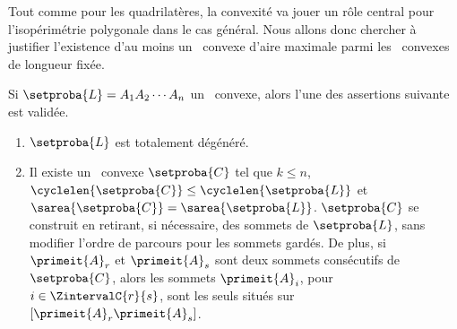 Tout comme pour les quadrilatères, la convexité va jouer un rôle central pour l’isopérimétrie polygonale dans le cas général.
Nous allons donc chercher à justifier l'existence d'au moins un \ngone\ convexe d'aire maximale parmi les \ngones\ convexes de longueur fixée.




\begin{fact} \label{conv-from-non-neg-det}
    Si $\setproba{L} = A_1 A_2 \cdots A_n$ un \ncycle\ convexe, alors l'une des assertions suivante est validée.
	\begin{enumerate}
		\item $\setproba{L}$ est totalement dégénéré.

		\item Il existe un \kgone\ convexe $\setproba{C}$ tel que
		$k \leq n$, 
		$\cyclelen{\setproba{C}} \leq \cyclelen{\setproba{L}}$
		et
		$\sarea{\setproba{C}} = \sarea{\setproba{L}}$.
		$\setproba{C}$ se construit en retirant, si nécessaire, des sommets de $\setproba{L}$, sans modifier l'ordre de parcours pour les sommets gardés.
		De plus,
		si $\primeit{A}_r$ et $\primeit{A}_s$ sont deux sommets consécutifs de $\setproba{C}$,
		alors les sommets $\primeit{A}_i$, pour $i \in \ZintervalC{r}{s}$, sont les seuls situés sur $[\primeit{A}_r \primeit{A}_s]$.
    \end{enumerate}
\end{fact}


